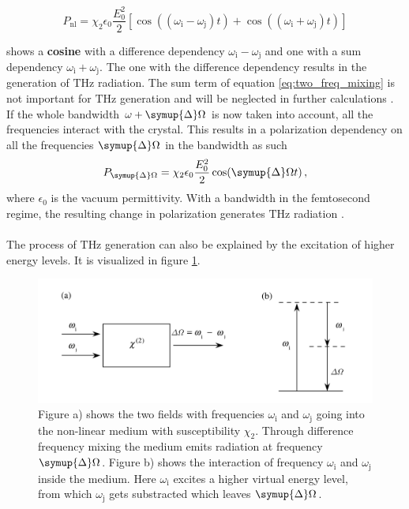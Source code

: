 \begin{equation}
    P_\text{nl} = \chi_2 \epsilon_0 \frac{E_0^2}{2}\left[\cos((\omega_\text{i} - \omega_\text{j})t) + \cos((\omega_\text{i} + \omega_\text{j})t)\right]
\label{eq:two_freq_mixing}
\end{equation}

shows a \textbf{cosine} with a difference dependency $\omega_\text{i}-\omega_\text{j}$ and one with a sum dependency $\omega_\text{i}+\omega_\text{j}$.
The one with the difference dependency results in the generation of $\si{\tera\hertz}$ radiation. %
The sum term of equation \eqref{eq:two_freq_mixing} is not important for $\si{\tera\hertz}$ generation and will be neglected in further calculations \cite{wiki_book}.
If the whole bandwidth $\omega + \symup{\Delta}\Omega$ is now taken into account, all the frequencies interact with the crystal.
This results in a polarization dependency on all the frequencies $\symup{\Delta}\Omega$ in the bandwidth as such
\begin{equation}
    P_{\symup{\Delta}\Omega} = \chi_2 \epsilon_0 \frac{E_0^2}{2}\cos(\symup{\Delta}\Omega t) \, ,
    \label{eq:polarization_depens}
\end{equation}
where $\epsilon_0$ is the vacuum permittivity.
With a bandwidth in the femtosecond regime, the resulting change in polarization generates $\si{\tera\hertz}$ radiation \cite{book_optical_rectification}\cite{wiki_book}.
\\\\
The process of $\si{\tera\hertz}$ generation can also be explained by the excitation of higher energy levels.
It is visualized in figure \ref{fig:freq_mix}.\FloatBarrier
\begin{figure}
    \centering
    \includegraphics[width=\textwidth]{refferenced_pic/diffrence_frequency_mixing.PNG}
    \caption{Figure a) shows the two fields with frequencies $\omega_\text{i} $ and $\omega_\text{j}$ going into the non-linear medium with susceptibility $\chi_2$.
    Through difference frequency mixing the medium emits radiation at frequency $\symup{\Delta}\Omega$.
    Figure b) shows the interaction of frequency $\omega_\text{i} $ and $\omega_\text{j}$ inside the medium.
    Here $\omega_\text{i}$ excites a higher virtual energy level, from which $\omega_\text{j}$ gets substracted which leaves $\symup{\Delta}\Omega$.}
    \label{fig:freq_mix}
\end{figure}\FloatBarrier
